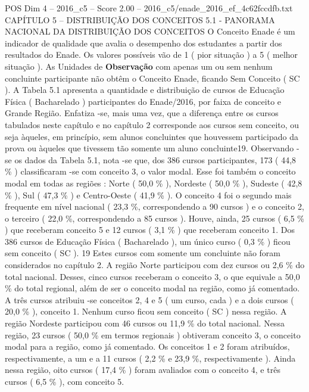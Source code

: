 \begin{textsample}{POS Dim 4 – 2016\_c5 – Score 2.00 – 2016\_c5/enade\_2016\_ef\_4c62fccdfb.txt}  \label{ex:f4_pos_103}
CAPÍTULO 5 – DISTRIBUIÇÃO DOS CONCEITOS 5.1 - PANORAMA NACIONAL DA DISTRIBUIÇÃO DOS CONCEITOS O Conceito Enade é um indicador de qualidade que avalia o desempenho dos estudantes a partir dos resultados do Enade.
Os valores possíveis vão de 1 ( pior situação ) a 5 ( melhor situação ).
As Unidades de \textbf{Observação} com apenas um ou sem nenhum concluinte participante não obtêm o Conceito Enade, ficando Sem Conceito ( SC ).
A Tabela 5.1 apresenta a quantidade e distribuição de cursos de Educação Física ( Bacharelado ) participantes do Enade/2016, por faixa de conceito e Grande Região.
Enfatiza -se, mais uma vez, que a diferença entre os cursos tabulados neste capítulo e no capítulo 2 corresponde aos cursos sem conceito, ou seja àqueles, em princípio, sem alunos concluintes que houvessem participado da prova ou àqueles que tivessem tão somente um aluno concluinte19.
Observando -se os dados da Tabela 5.1, nota -se que, dos 386 cursos participantes, 173 ( 44,8 \% ) classificaram -se com conceito 3, o valor modal.
Esse foi também o conceito modal em todas as regiões : Norte ( 50,0 \% ), Nordeste ( 50,0 \% ), Sudeste ( 42,8 \% ), Sul ( 47,3 \% ) e Centro-Oeste ( 41,9 \% ).
O conceito 4 foi o segundo mais frequente em nível nacional ( 23,3 \%, correspondendo a 90 cursos ) e o conceito 2, o terceiro ( 22,0 \%, correspondendo a 85 cursos ).
Houve, ainda, 25 cursos ( 6,5 \% ) que receberam conceito 5 e 12 cursos ( 3,1 \% ) que receberam conceito 1.
Dos 386 cursos de Educação Física ( Bacharelado ), um único curso ( 0,3 \% ) ficou sem conceito ( SC ). 19 Estes cursos com somente um concluinte não foram considerados no capítulo 2.
A região Norte participou com dez cursos ou 2,6 \% do total nacional.
Desses, cinco cursos receberam o conceito 3, o que equivale a 50,0 \% do total regional, além de ser o conceito modal na região, como já comentado.
A três cursos atribuiu -se conceitos 2, 4 e 5 ( um curso, cada ) e a dois cursos ( 20,0 \% ), conceito 1.
Nenhum curso ficou sem conceito ( SC ) nessa região.
A região Nordeste participou com 46 cursos ou 11,9 \% do total nacional.
Nessa região, 23 cursos ( 50,0 \% em termos regionais ) obtiveram conceito 3, o conceito modal para a região, como já comentado.
Os conceitos 1 e 2 foram atribuídos, respectivamente, a um e a 11 cursos ( 2,2 \% e 23,9 \%, respectivamente ).
Ainda nessa região, oito cursos ( 17,4 \% ) foram avaliados com o conceito 4, e três cursos ( 6,5 \% ), com conceito 5.

\end{textsample}
